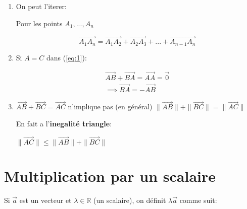 \documentclass[
    11pt,
    a4paper,
    oneside,
    headinlcude, footinclude,
    twoside,
]{report}
\renewcommand{\vec}[1]{\overrightarrow{#1}}
\begin{document}
\begin{enumerate}
    \item On peut l'iterer:
        \begin{center}
        \end{center}

        Pour les points $A_{1}, ..., A_{n}$

        $$\vec{A_{1} A_{n}} = \vec{A_{1} A_{2}} + \vec{A_{2} A_{3}} + ... + \vec{A_{n-1} A_{n}}$$

    \item Si $A = C$ dans (\ref{eq:1}):

        \begin{equation}
            \begin{split}
                \vec{AB} + \vec{BA} = \vec{AA} = \vec 0 
                \\ 
                \implies \vec{BA} = -\vec{AB} 
            \end{split}
        \end{equation}

    \item $\vec{AB} + \vec{BC} = \vec{AC}$ n'implique pas (en général) $\|\vec{AB}\| + \|\vec{BC}\| = \|\vec{AC}\|$

        En fait a l'\textbf{inegalité triangle}:
        \begin{highlightBox}[frametitle={Inegalité triangle}]
            \center
                $\|\vec{AC}\| \leq \|\vec{AB}\| + \|\vec{BC}\|$
        \end{highlightBox}
\end{enumerate}

\section{Multiplication par un scalaire}
\label{sec:multiplication_par_un_scalaire}

Si $\vec a$ est un vecteur et $\lambda \in \mathbb{R}$ (un scalaire), on
définit $\lambda \vec a$ comme suit:
\end{document}
